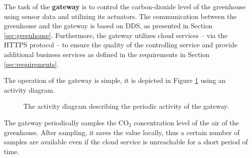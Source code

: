 \documentclass[a4paper, 11pt]{article}
\begin{document}
	The task of the \textbf{gateway} is to control the carbon-dioxide level of the greenhouse using sensor data and utilizing its actuators. The communication between the greenhouse and the gateway is based on DDS, as presented in Section \ref{sec:greenhouse}. Furthermore, the gateway utilizes cloud services -- via the HTTPS protocol -- to ensure the quality of the controlling service and provide additional business services as defined in the requirements in Section \ref{sec:requirements}.	
	
	The operation of the gateway is simple, it is depicted in Figure \ref{fig:activity} using an activity diagram.
	
	\begin{figure}[h!]
		\center
		\caption{The activity diagram describing the periodic activity of the gateway.}
		\label{fig:activity}
	\end{figure}
	
	The gateway periodically samples the CO$_2$ concentration level of the air of the greenhouse. After sampling, it saves the value locally, thus a certain number of samples are available even if the cloud service is unreachable for a short period of time. 
	
\end{document}

